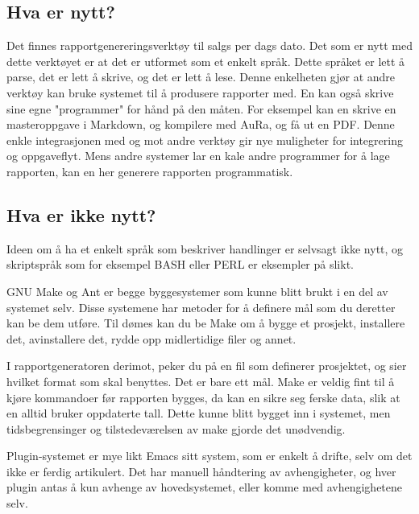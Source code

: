 \documentclass[11pt]{article}
\begin{document}
\subsection{Hva er nytt?}



Det finnes rapportgenereringsverktøy til salgs per dags dato. Det som er nytt med dette verktøyet er at det er utformet som et enkelt språk. Dette språket er lett å parse, det er lett å skrive, og det er lett å lese. Denne enkelheten gjør at andre verktøy kan bruke systemet til å produsere rapporter med. En kan også skrive sine egne "programmer" for hånd på den måten. For eksempel kan en skrive en masteroppgave i Markdown, og kompilere med AuRa, og få ut en PDF. Denne enkle integrasjonen med og mot andre verktøy gir nye muligheter for integrering og oppgaveflyt. Mens andre systemer lar en kale andre programmer for å lage rapporten, kan en her generere rapporten programmatisk.



\subsection{Hva er ikke nytt?}



Ideen om å ha et enkelt språk som beskriver handlinger er selvsagt ikke nytt, og skriptspråk som for eksempel BASH eller PERL er eksempler på slikt.



GNU Make og Ant er begge byggesystemer som kunne blitt brukt i en del av systemet selv. Disse systemene har metoder for å definere mål som du deretter kan be dem utføre. Til dømes kan du be Make om å bygge et prosjekt, installere det, avinstallere det, rydde opp midlertidige filer og annet.



I rapportgeneratoren derimot, peker du på en fil som definerer prosjektet, og sier hvilket format som skal benyttes. Det er bare ett mål.
Make er veldig fint til å kjøre kommandoer før rapporten bygges, da kan en sikre seg ferske data, slik at en alltid bruker oppdaterte tall.
Dette kunne blitt bygget inn i systemet, men tidsbegrensinger og tilstedeværelsen av make gjorde det unødvendig.



Plugin-systemet er mye likt Emacs sitt system, som er enkelt å drifte, selv om det ikke er ferdig artikulert. Det har manuell håndtering av avhengigheter, og hver plugin antas å kun avhenge av hovedsystemet, eller komme med avhengighetene selv.
\end{document}
